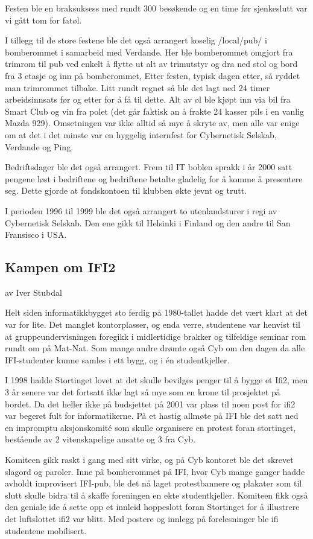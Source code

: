 \documentclass[../main.tex]{subfiles}
\begin{document}
Festen ble en braksuksess med rundt 300 besøkende og en time før sjenkeslutt var vi gått tom for fatøl.

I tillegg til de store festene ble det også arrangert koselig /local/pub/ i bomberommet i samarbeid med Verdande. Her ble bomberommet omgjort fra trimrom til pub ved enkelt å flytte ut alt av trimutstyr og dra ned stol og bord fra 3 etasje og inn på bomberommet, Etter festen, typisk dagen etter, så ryddet man trimrommet tilbake. Litt rundt regnet så ble det lagt ned 24 timer arbeidsinnsats før og etter for å få til dette. Alt av øl ble kjøpt inn via bil fra Smart Club og vin fra polet (det går faktisk an å frakte  24 kasser pils i en vanlig Mazda 929). Omsetningen var ikke alltid så mye å skryte av, men alle var enige om at det i det minste var en hyggelig internfest for Cybernetisk Selskab, Verdande og Ping.

Bedriftsdager ble det også arrangert. Frem til IT boblen sprakk i år 2000 satt pengene løst i bedriftene og bedriftene betalte gladelig for å komme å presentere seg. Dette gjorde at fondskontoen til klubben økte jevnt og trutt.

I perioden 1996 til 1999 ble det også arrangert to utenlandsturer i regi av Cybernetisk Selskab. Den ene gikk til Helsinki i Finland og den andre til San Fransisco i USA.

\subsection{Kampen om IFI2}
av Iver Stubdal

Helt siden informatikkbygget sto ferdig på 1980-tallet hadde det vært klart at det var for lite. Det manglet kontorplasser, og enda verre, studentene var henvist til at gruppeundervisningen foregikk i midlertidige brakker og tilfeldige seminar rom rundt om på Mat-Nat. Som mange andre drømte også Cyb om den dagen da alle IFI-studenter kunne samles i ett bygg, og i én studentkjeller.

I 1998 hadde Stortinget lovet at det skulle bevilges penger til å bygge et Ifi2, men 3 år senere var det fortsatt ikke lagt så mye som en krone til prosjektet på bordet. Da det heller ikke på budsjettet på 2001 var plass til noen post for ifi2 var begeret fult for informatikerne. På et hastig allmøte på IFI ble det satt ned en impromptu aksjonskomité som skulle organisere en protest foran stortinget, bestående av 2 vitenskapelige ansatte og 3 fra Cyb.

Komiteen gikk raskt i gang med sitt virke, og på Cyb kontoret ble det skrevet slagord og paroler. Inne på bomberommet på IFI, hvor Cyb mange ganger hadde avholdt improvisert IFI-pub, ble det nå laget protestbannere og plakater som til slutt skulle bidra til å skaffe foreningen en ekte studentkjeller. Komiteen fikk også den geniale ide å sette opp et innleid hoppeslott foran Stortinget for å illustrere det luftslottet ifi2 var blitt. Med postere og innlegg på forelesninger ble ifi studentene mobilisert.
\end{document}
